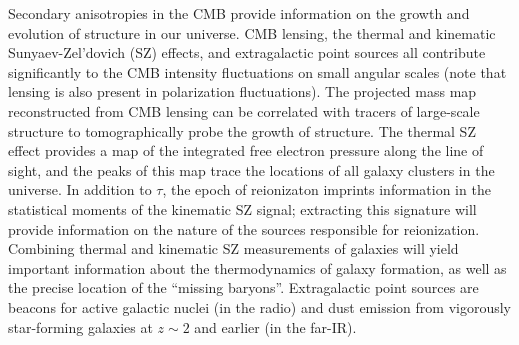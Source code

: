 \documentclass[PICOReport.tex]{subfiles}
\begin{document}
Secondary anisotropies in the CMB provide information on the growth and evolution of structure in our universe. 
CMB lensing, the thermal and kinematic Sunyaev-Zel'dovich (SZ) effects, and extragalactic point sources all 
contribute significantly to the CMB intensity fluctuations on small angular scales (note that lensing is also 
present in polarization fluctuations). The projected mass map reconstructed from CMB lensing can be correlated with tracers of 
large-scale structure to tomographically probe the growth of structure.  The thermal SZ effect provides a map of 
the integrated free electron pressure along the line of sight, and the peaks of this map trace the locations of 
all galaxy clusters in the universe. In addition to $\tau$, the epoch of reionizaton imprints information in the 
statistical moments of the kinematic SZ signal; extracting this signature will provide information on the nature 
of the sources responsible for reionization.  Combining thermal and kinematic SZ measurements of galaxies 
will yield important information about the thermodynamics of galaxy formation, as well as the precise location 
of the ``missing baryons''. Extragalactic point sources are beacons for active galactic nuclei (in the radio) and 
dust emission from vigorously star-forming galaxies at $z \sim 2$ and earlier (in the far-IR).


\end{document}
